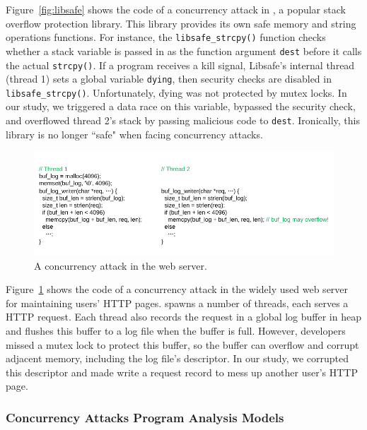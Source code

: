 Figure~\ref{fig:libsafe} shows the code of a concurrency attack in 
\libsafe, a popular stack overflow protection library. This library 
provides its own safe memory and string operations functions. For instance, the 
\texttt{libsafe\_strcpy()} function checks whether a stack variable is passed in as 
the function argument \texttt{dest} before it calls the actual \texttt{strcpy()}. If a program 
receives a kill signal, Libsafe's internal thread (thread 1) sets a global variable 
\texttt{dying}, then security checks are disabled in \texttt{libsafe\_strcpy()}. Unfortunately, 
\v{dying} was not protected by mutex locks. In our study, we triggered a data race on this variable, bypassed the security 
check, and overflowed thread 2's stack by passing malicious code to \texttt{dest}. Ironically, this 
\libsafe library is no longer ``safe" when facing concurrency attacks.

\begin{figure}[h]
\centering
\includegraphics[width=0.8\columnwidth]{figures/apache}
\vspace{-.05in}
\caption{{A concurrency attack in the \apache web server.}} \label{fig:apache}
\vspace{-.15in}
\end{figure}

Figure~\ref{fig:apache} shows the code of a concurrency attack in 
the widely used \apache web server for maintaining users' HTTP pages. \apache spawns a number of threads,  
each serves a HTTP request. Each thread also records the request in a global log 
buffer in heap and flushes this buffer to a log file when the buffer is full. However, developers 
missed a mutex lock to protect this buffer, so the buffer can overflow and corrupt 
adjacent memory, including the log file's descriptor. In our study, we corrupted this 
descriptor and made \apache write a request record to mess up another user's HTTP page.



\vspace{-.15in}\subsubsection{Concurrency Attacks Program Analysis Models} 
\label{sec:attack-phase}\vspace{-.075in}

